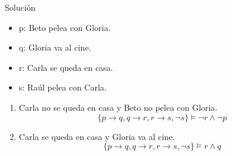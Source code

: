 \documentclass{article}
\begin{document}
\begin{enumerate}
		 Solución \\
		\begin{itemize}
		    \item p: Beto pelea con Gloria.
		    \item q: Gloria va al cine.
		    \item r: Carla se queda en casa.
		    \item s: Raúl pelea con Carla.
		\end{itemize}
		
		 \begin{enumerate}
		 
		    \item Carla no se queda en casa y Beto no pelea con Gloria.
		        \begin{equation}
                    \{ p  \to q, q \to r, r \to s, \neg s
                    \} \models \neg r \land \neg p
                \end{equation}
                
                \begin{prooftree}
        		\end{prooftree}
                
		    \item Carla se queda en casa y Gloria va al cine.
		        \begin{equation}
                    \{ p  \to q, q \to r, r \to s, \neg s
                    \} \models  r \land q
                \end{equation}
                
               \begin{prooftree}
        		    
        		    

\end{prooftree}
\end{enumerate}
\end{enumerate}
\end{document}
